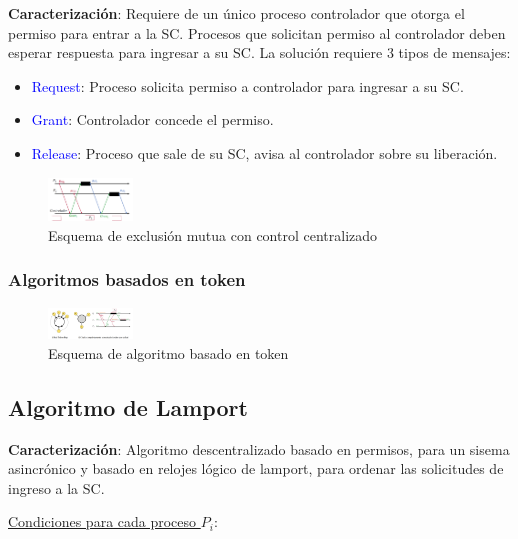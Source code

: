 \textbf{Caracterización}: Requiere de un único proceso controlador que otorga el permiso para entrar a la SC. Procesos que solicitan permiso al controlador deben esperar respuesta para ingresar a su SC. La solución requiere 3 tipos de mensajes: 

\begin{itemize}
    \item \textcolor{blue}{Request}: Proceso solicita permiso a controlador para ingresar a su SC.
    \item \textcolor{blue}{Grant}: Controlador concede el permiso.
    \item \textcolor{blue}{Release}: Proceso que sale de su SC, avisa al controlador sobre su liberación.
\end{itemize}

\begin{figure}[H]
    \centering
    \includegraphics[width=0.2\textwidth]{img/E_M_Control_Centralizado.png}
    \caption{Esquema de exclusión mutua con control centralizado}
\end{figure}

\subsubsection{Algoritmos basados en token}

\begin{figure}[H]
    \centering
    \includegraphics[width=0.2\textwidth]{img/Algoritmos_token.png}
    \caption{Esquema de algoritmo basado en token}
\end{figure}

\subsection{Algoritmo de Lamport} 

\textbf{Caracterización}: Algoritmo descentralizado basado en permisos, para un sisema asincrónico y basado en relojes lógico de lamport, para ordenar las solicitudes de ingreso a la SC.

\vspace{0.5em}
\underline{Condiciones para cada proceso $P_i$}: 

